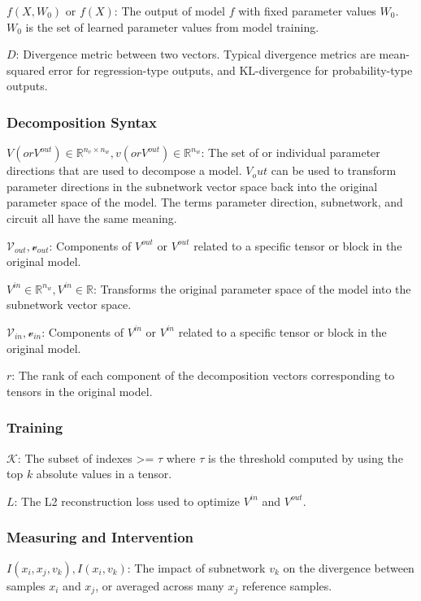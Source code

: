 \documentclass{article}
\theoremstyle{plain}
\theoremstyle{definition}
\theoremstyle{remark}
\begin{document}
$f(X, W_0)$ or $f(X)$: The output of model $f$ with fixed parameter values $W_0 $. $W_0$ is the set of learned parameter values from model training.

$D$: Divergence metric between two vectors. Typical divergence metrics are mean-squared error for regression-type outputs, and KL-divergence for probability-type outputs. 

\subsubsection{Decomposition Syntax}
$V (or V^{out}) \in \mathbb{R}^{n_v \times n_w}, v (or V^{out})  \in \mathbb{R}^{n_w}$: The set of or individual parameter directions that are used to decompose a model. $V_out$ can be used to transform parameter directions in the subnetwork vector space back into the original parameter space of the model. The terms parameter direction, subnetwork, and circuit all have the same meaning. 

$\mathcal{V}_{out}, \mathcal{v}_{out}$: Components of $V^{out}$ or $V^{out}$ related to a specific tensor or block in the original model. 

$V^{in} \in \mathbb{R}^{n_w}, V^{in} \in \mathbb{R}$: Transforms the original parameter space of the model into the subnetwork vector space. 

$\mathcal{V}_{in}, \mathcal{v}_{in}$: Components of $V^{in}$ or $V^{in}$ related to a specific tensor or block in the original model. 

$r$: The rank of each component of the decomposition vectors corresponding to tensors in the original model. 

\subsubsection{Training}

$\mathcal{K}$: The subset of indexes >= $\tau$ where $\tau$ is the threshold computed by using the top $k$ absolute values in a tensor. 

$L$: The L2 reconstruction loss used to optimize $V^{in}$ and $V^{out}$.

\subsubsection{Measuring and Intervention}
$I(x_i, x_j, v_k), I(x_i, v_k)$: The impact of subnetwork $v_k$ on the divergence between samples $x_i$ and $x_j$, or averaged across many $x_j$ reference samples.
\end{document}
